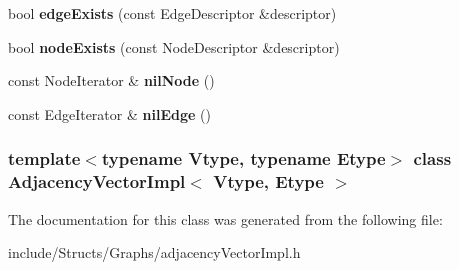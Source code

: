\begin{DoxyCompactItemize}
\item 
\hypertarget{class_adjacency_vector_impl_a192ceacda3e8f5fa290fc355b7ad8472}{
bool {\bfseries edgeExists} (const EdgeDescriptor \&descriptor)}
\label{class_adjacency_vector_impl_a192ceacda3e8f5fa290fc355b7ad8472}

\item 
\hypertarget{class_adjacency_vector_impl_a2902a1b6ff9943ca48c558e8e003fe6c}{
bool {\bfseries nodeExists} (const NodeDescriptor \&descriptor)}
\label{class_adjacency_vector_impl_a2902a1b6ff9943ca48c558e8e003fe6c}

\item 
\hypertarget{class_adjacency_vector_impl_a04d42af33bd0c1917c23c939f2fe5a2d}{
const NodeIterator \& {\bfseries nilNode} ()}
\label{class_adjacency_vector_impl_a04d42af33bd0c1917c23c939f2fe5a2d}

\item 
\hypertarget{class_adjacency_vector_impl_ad8fb77aaced9f2ba4b1d45ce6fe54171}{
const EdgeIterator \& {\bfseries nilEdge} ()}
\label{class_adjacency_vector_impl_ad8fb77aaced9f2ba4b1d45ce6fe54171}

\end{DoxyCompactItemize}
\subsubsection*{template$<$typename Vtype, typename Etype$>$ class AdjacencyVectorImpl$<$ Vtype, Etype $>$}



The documentation for this class was generated from the following file:\begin{DoxyCompactItemize}
\item 
include/Structs/Graphs/adjacencyVectorImpl.h\end{DoxyCompactItemize}
